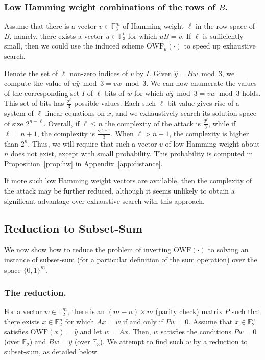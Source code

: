 \documentclass[orivec,envcountsect]{llncs}
\newcommand{\OWF}{\text{OWF}}
\begin{document}
\subsubsection{Low Hamming weight combinations of the rows of $B$.}
Assume that there is a vector $v \in \mathbb{F}_3^m$ of Hamming weight $\ell$ in the row space of $B$, namely, there exists a vector $u \in \mathbb{F}_3^t$ for which $u B = v$. If $\ell$ is sufficiently small, then we could use the induced scheme $\OWF_u(\cdot)$ to speed up exhaustive search.

Denote the set of $\ell$ non-zero indices of $v$ by $I$. Given $\hat{y} = Bw \bmod 3$, we compute the value of $u\hat{y} \bmod 3 = vw \bmod 3$. We can now enumerate the values of the corresponding set $I$ of $\ell$ bits of $w$ for which $u\hat{y} \bmod 3 = vw \bmod 3$ holds. This set of bits has $\tfrac{2^\ell}{3}$ possible values. Each such $\ell$-bit value gives rise of a system of $\ell$ linear equations on $x$, and we exhaustively search its solution space of size $2^{n-\ell}$. Overall, if $\ell \leq n$ the complexity of the attack is
$\tfrac{2^{\ell}}{3}$, while if $\ell = n+1$, the complexity is $\tfrac{2^{\ell+1}}{3}$. When $\ell > n+1$, the complexity is higher than $2^n$.
Thus, we will require that such a vector $v$ of low Hamming weight about $n$ does not exist, except with small probability.
This probability is computed in Proposition~\ref{prop:hw} in Appendix~\ref{app:distance}.

If more such low Hamming weight vectors are available, then the complexity of the attack may be further reduced,
although it seems unlikely to obtain a significant advantage over exhaustive search with this approach.



\subsection{Reduction to Subset-Sum}
\label{sec:improved}

We now show how to reduce the problem of inverting $\OWF(\cdot)$ to solving an instance of subset-sum (for a particular definition of the sum operation) over the space $\{0,1\}^m$.

\subsubsection{The reduction.}
For a vector $w \in \mathbb{F}_2^m$, there is an $(m -n) \times m$ (parity check) matrix $P$ such that there exists $x \in \mathbb{F}_2^n$ for which $Ax = w$ if and only if $P w=0$.
Assume that $x \in \mathbb{F}_2^n$ satisfies $\OWF(x) = \hat{y}$ and let $w = Ax$. Then,
$w$ satisfies the conditions $P w = 0$ (over $\mathbb{F}_2$) and $Bw = \hat{y}$ (over $\mathbb{F}_3$).
We attempt to find such $w$ by a reduction to subset-sum, as detailed below.
\end{document}
